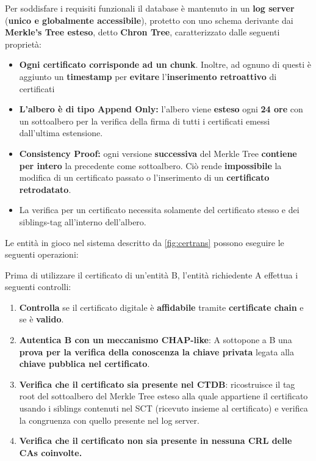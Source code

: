 Per soddisfare i requisiti funzionali il database è mantenuto in un \textbf{log server} (\textbf{unico e globalmente accessibile}), protetto
con uno schema derivante dai \textbf{Merkle's Tree esteso}, detto \textbf{Chron Tree}, caratterizzato dalle seguenti proprietà:
\begin{proposition}
\begin{itemize}
    \item \textbf{Ogni certificato corrisponde ad un chunk}. Inoltre, ad ognuno di questi è aggiunto un \textbf{timestamp} per \textbf{evitare} l'\textbf{inserimento retroattivo} di certificati
    \item \textbf{L'albero è di tipo Append Only:} l'albero viene \textbf{esteso} ogni \textbf{24 ore} con un sottoalbero per la verifica della firma di tutti i certificati emessi dall'ultima estensione.
    \item \textbf{Consistency Proof:} ogni versione \textbf{successiva} del Merkle Tree \textbf{contiene per intero} la precedente come sottoalbero. Ciò rende \textbf{impossibile} la modifica di un certificato passato o l'inserimento di un \textbf{certificato retrodatato}.
    \item La verifica per un certificato necessita solamente del certificato stesso e dei siblings-tag all'interno dell'albero.
\end{itemize}
\end{proposition}
Le entità in gioco nel sistema descritto da \cref{fig:certrans} possono eseguire le seguenti operazioni:
\begin{proposition}
Prima di utilizzare il certificato di un'entità B, l'entità richiedente A effettua i seguenti controlli:
\begin{enumerate}
    \item \textbf{Controlla} se il certificato digitale è \textbf{affidabile} tramite \textbf{certificate chain} e se è \textbf{valido}.
    \item\textbf{ Autentica B con un meccanismo CHAP-like}: A sottopone a B una \textbf{prova per la verifica della conoscenza la chiave privata} legata alla\textbf{ chiave pubblica nel certificato}.
    \item \textbf{Verifica che il certificato sia presente nel CTDB}: ricostruisce il tag root del sottoalbero del Merkle Tree esteso alla quale appartiene il certificato usando i siblings contenuti nel SCT (ricevuto insieme al certificato) e verifica la congruenza con quello presente nel log server.
    \item \textbf{Verifica che il certificato non sia presente in nessuna CRL delle CAs coinvolte.}
\end{enumerate}
\end{proposition}

